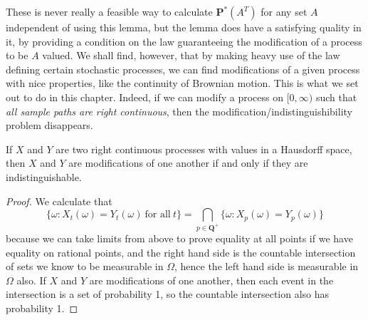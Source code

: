 These is never really a feasible way to calculate $\mathbf{P}^*(A^T)$ for any set $A$ independent of using this lemma, but the lemma does have a satisfying quality in it, by providing a condition on the law guaranteeing the modification of a process to be $A$ valued. We shall find, however, that by making heavy use of the law defining certain stochastic processes, we can find modifications of a given process with nice properties, like the continuity of Brownian motion. This is what we set out to do in this chapter. Indeed, if we can modify a process on $[0,\infty)$ such that {\it all sample paths are right continuous}, then the modification/indistinguishibility problem disappears.

\begin{theorem}
    If $X$ and $Y$ are two right continuous processes with values in a Hausdorff space, then $X$ and $Y$ are modifications of one another if and only if they are indistinguishable.
\end{theorem}
\begin{proof}
    We calculate that
    \[ \{ \omega:  X_t(\omega) = Y_t(\omega)\ \text{for all}\ t \} = \bigcap_{p \in \mathbf{Q}^+} \{ \omega: X_p(\omega) = Y_p(\omega) \} \]
    because we can take limits from above to prove equality at all points if we have equality on rational points, and the right hand side is the countable intersection of sets we know to be measurable in $\Omega$, hence the left hand side is measurable in $\Omega$ also. If $X$ and $Y$ are modifications of one another, then each event in the intersection is a set of probability 1, so the countable intersection also has probability 1.
\end{proof}


